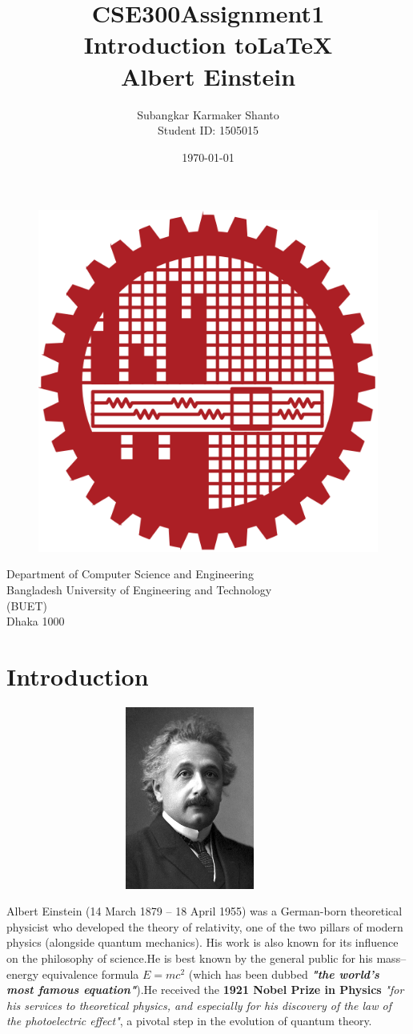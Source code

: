 \documentclass{article}
\title {CSE300\textunderscore Assignment1\\Introduction to\LaTeX\\Albert Einstein}
\author{Subangkar Karmaker Shanto\\Student ID: 1505015}
\date{}
\begin{document}
\begin{titlepage}
\maketitle
\thispagestyle{empty}
\null
\vfill
\begin{figure}[h]
    \centering
    \includegraphics[width=.25\textwidth]{figures/logoBIRN.png}
    \label{fig:logo}
\end{figure}
\begin{center}
Department of Computer Science and Engineering \\Bangladesh University of Engineering and Technology\\(BUET)\\Dhaka 1000 \\
\date{\today}
    
\end{center}
\end{titlepage}

\newpage


\section{Introduction}



\begin{figure}[h!]
    \includegraphics[width=10cm,height=6cm,keepaspectratio]{figures/Albert_Einstein_(Nobel).png}
    \label{fig:einstein_ProPic}
\end{figure}

Albert Einstein (14 March 1879 – 18 April 1955) was a German-born theoretical physicist who developed the theory of relativity, one of the two pillars of modern physics (alongside quantum mechanics). His work is also known for its influence on the philosophy of science.He is best known by the general public for his mass–energy equivalence formula \textbf{$E = mc^2$} (which has been dubbed \textbf{\textit{"the world's most famous equation"}}).He received the \textbf{1921 Nobel Prize in Physics} \textit{"for his services to theoretical physics, and especially for his discovery of the law of the photoelectric effect"}, a pivotal step in the evolution of quantum theory.
\end{document}
